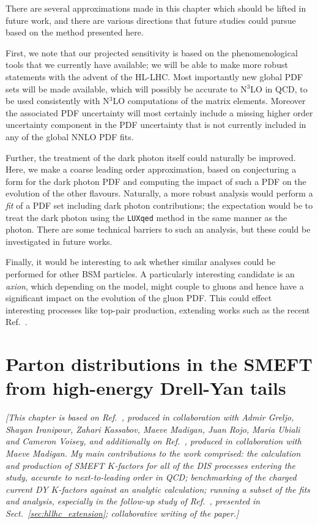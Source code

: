 \documentclass[withindex,glossary]{cam-thesis}
\begin{document}
There are several approximations made in this chapter which should be lifted in future work, and there are various directions that future studies could pursue based on the method presented here.

First, we note that our projected sensitivity is based on the phenomenological tools that we currently have available; we will be able to make more robust statements with the advent of the HL-LHC. Most importantly new global PDF sets will be made available, which will possibly be accurate to N$^3$LO in QCD, to be used consistently with N$^3$LO computations of the matrix elements. Moreover the associated PDF uncertainty will most certainly include a missing higher order uncertainty component in the PDF uncertainty that is not currently included in any of the global NNLO PDF fits.

Further, the treatment of the dark photon itself could naturally be improved. Here, we make a coarse leading order approximation, based on conjecturing a form for the dark photon PDF and computing the impact of such a PDF on the evolution of the other flavours. Naturally, a more robust analysis would perform a \textit{fit} of a PDF set including dark photon contributions; the expectation would be to treat the dark photon using the \texttt{LUXqed} method in the same manner as the photon. There are some technical barriers to such an analysis, but these could be investigated in future works.

Finally, it would be interesting to ask whether similar analyses could be performed for other BSM particles. A particularly interesting candidate is an \textit{axion}, which depending on the model, might couple to gluons and hence have a significant impact on the evolution of the gluon PDF. This could effect interesting processes like top-pair production, extending works such as the recent Ref.~\cite{Esser:2023fdo}. 


 


\newpage
\chapter{Parton distributions in the SMEFT from high-energy Drell-Yan tails}
\label{chap:smeftdy}

\noindent \textit{[This chapter is based on Ref.~\cite{Greljo:2021kvv}, produced in collaboration with Admir Greljo, Shayan Iranipour, Zahari Kassabov, Maeve Madigan, Juan Rojo, Maria Ubiali and Cameron Voisey, and additionally on Ref.~\cite{Madigan:2021uho}, produced in collaboration with Maeve Madigan. My main contributions to the work comprised: the calculation and production of SMEFT $K$-factors for all of the DIS processes entering the study, accurate to next-to-leading order in QCD; benchmarking of the charged current DY $K$-factors against an analytic calculation; running a subset of the fits and analysis, especially in the follow-up study of Ref.~\cite{Madigan:2021uho}, presented in Sect.~\ref{sec:hllhc_extension}; collaborative writing of the paper.]}\\
\end{document}
